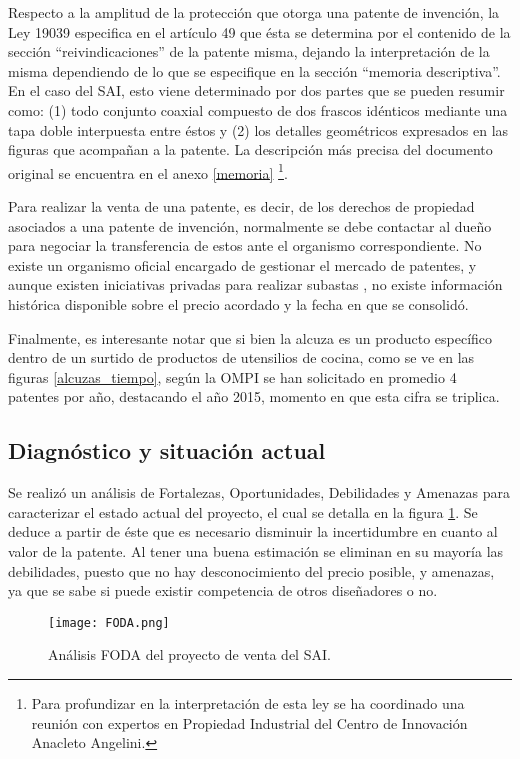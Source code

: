 Respecto a la amplitud de la protección que otorga una patente de invención, la Ley 19039 especifica en el artículo 49 que ésta se determina por el contenido de la sección “reivindicaciones” de la patente misma, dejando la interpretación de la misma dependiendo de lo que se especifique en la sección “memoria descriptiva”. En el caso del SAI,  esto viene determinado por dos partes que se pueden resumir como: (1) todo conjunto coaxial compuesto de dos frascos idénticos mediante una tapa doble interpuesta entre éstos y (2) los detalles geométricos  expresados en las figuras que acompañan a la patente. La descripción más precisa del documento original se encuentra en el anexo \ref{memoria}
\footnote{Para profundizar en la interpretación de esta ley se ha coordinado una reunión con expertos en Propiedad Industrial del Centro de Innovación Anacleto Angelini.}.


Para realizar la venta de una patente, es decir, de los derechos de propiedad asociados a una patente de invención, normalmente se debe contactar al dueño para negociar la transferencia de estos ante el organismo correspondiente. No existe un organismo oficial encargado de gestionar el mercado de patentes, y aunque existen iniciativas privadas para realizar subastas , no existe información histórica disponible sobre el precio acordado y la fecha en que se consolidó.


Finalmente, es interesante notar que si bien la alcuza es un producto específico dentro de un surtido de productos de utensilios de cocina, como se ve en las figuras \ref{alcuzas_tiempo},
según la OMPI se han solicitado en promedio 4 patentes por año, destacando el año 2015, momento en que esta cifra se triplica.


\subsection{Diagnóstico y situación actual}

Se realizó un análisis de Fortalezas, Oportunidades, Debilidades y Amenazas para caracterizar el estado actual del proyecto, el cual se detalla en la figura \ref{foda1}. Se deduce a partir de éste que es necesario disminuir la incertidumbre en cuanto al valor de la patente. Al tener una buena estimación se eliminan en su mayoría las debilidades, puesto que no hay desconocimiento del precio posible, y amenazas, ya que se sabe si puede existir competencia de otros diseñadores o no.


\begin{figure}[H]
  \texttt{[image: FODA.png]}
  \caption{Análisis FODA del proyecto de venta del SAI.}
  \label{foda1}
\end{figure}

